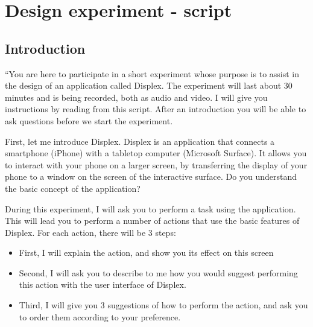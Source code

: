 
\chapter{Design experiment - script}
\label{app:study}

\section{Introduction}
``You are here to participate in a short experiment whose purpose is to assist in the design of an application called Displex.
The experiment will last about 30 minutes and is being recorded, both as audio and video.
I will give you instructions by reading from this script.
After an introduction you will be able to ask questions before we start the experiment.

First, let me introduce Displex.
Displex is an application that connects a smartphone (iPhone) with a tabletop computer (Microsoft Surface).
It allows you to interact with your phone on a larger screen, by transferring the display of your phone to a window on the screen of the interactive surface.
Do you understand the basic concept of the application?

During this experiment, I will ask you to perform a task using the application.
This will lead you to perform a number of actions that use the basic features of Displex.
For each action, there will be 3 steps:

\begin{itemize}
\item{First, I will explain the action, and show you its effect on this screen}
\item{Second, I will ask you to describe to me how you would suggest performing this action with the user interface of Displex.}
\item{Third, I will give you 3 suggestions of how to perform the action, and ask you to order them according to your preference.}
\end{itemize}

